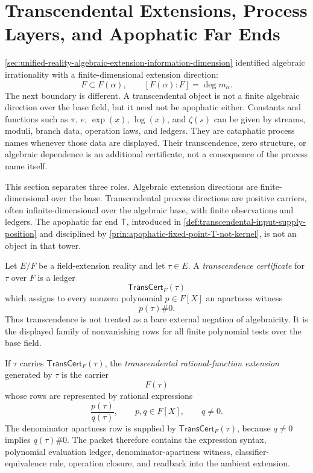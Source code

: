 \section{Transcendental Extensions, Process Layers, and Apophatic Far Ends}
\label{sec:unified-reality-transcendental-process-far-end}

\autoref{sec:unified-reality-algebraic-extension-information-dimension}
identified algebraic irrationality with a finite-dimensional extension
direction:
$$
F\subset F(\alpha),
\qquad
[F(\alpha):F]=\deg m_\alpha.
$$
The next boundary is different. A transcendental object is not a finite
algebraic direction over the base field, but it need not be apophatic
either. Constants and functions such as $\pi$, $e$, $\exp(x)$, $\log(x)$,
and $\zeta(s)$ can be given by streams, moduli, branch data, operation
laws, and ledgers. They are cataphatic process names whenever those
data are displayed. Their transcendence, zero structure, or algebraic
dependence is an additional certificate, not a consequence of the
process name itself.

This section separates three roles. Algebraic extension directions are
finite-dimensional over the base. Transcendental process directions are
positive carriers, often infinite-dimensional over the algebraic base,
with finite observations and ledgers. The apophatic far end
$\mathsf{T}$, introduced in
\autoref{def:transcendental-input-supply-position} and disciplined by
\autoref{prin:apophatic-fixed-point-T-not-kernel}, is not an object in
that tower.

\begin{definition}
\label{def:unified-reality-transcendence-certificate}
Let $E/F$ be a field-extension reality and let $\tau\in E$. A
\emph{transcendence certificate} for $\tau$ over $F$ is a ledger
$$
\mathsf{TransCert}_F(\tau)
$$
which assigns to every nonzero polynomial $p\in F[X]$ an apartness
witness
$$
p(\tau)\#0.
$$
Thus transcendence is not treated as a bare external negation of
algebraicity. It is the displayed family of nonvanishing rows for all
finite polynomial tests over the base field.
\end{definition}

\begin{definition}
\label{def:unified-reality-transcendental-rational-function-extension}
If $\tau$ carries $\mathsf{TransCert}_F(\tau)$, the
\emph{transcendental rational-function extension} generated by $\tau$ is
the carrier
$$
F(\tau)
$$
whose rows are represented by rational expressions
$$
\frac{p(\tau)}{q(\tau)},
\qquad
p,q\in F[X],
\qquad
q\neq0.
$$
The denominator apartness row is supplied by
$\mathsf{TransCert}_F(\tau)$, because $q\neq0$ implies
$q(\tau)\#0$. The packet therefore contains the expression syntax,
polynomial evaluation ledger, denominator-apartness witness,
classifier-equivalence rule, operation closure, and readback into the
ambient extension.
\end{definition}

